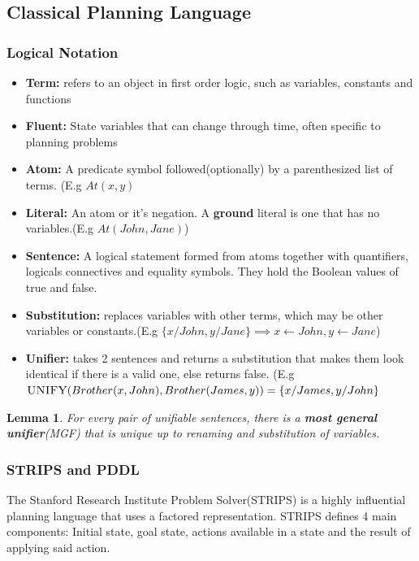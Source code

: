 \documentclass[11pt]{article}
\newtheorem{lemma}{Lemma}
\begin{document}
\subsection{Classical Planning Language}
\subsubsection{Logical Notation} 

\begin{itemize}
    \item \textbf{Term:} refers to an object in first order logic, such as variables, constants and functions
    \item \textbf{Fluent:} State variables that can change through time, often specific to planning problems
    \item \textbf{Atom:} A predicate symbol followed(optionally) by a parenthesized list of terms. (E.g $At(x, y)$
    \item \textbf{Literal:} An atom or it's negation. A \textbf{ground} literal is one that has no variables.(E.g $At(John, Jane)$)
    \item \textbf{Sentence:} A logical statement formed from atoms together with quantifiers, logicals connectives and equality symbols. They hold the Boolean values of true and false.
    \item \textbf{Substitution:} replaces variables with other terms, which may be other variables or constants.(E.g $\{x/John, y/Jane\}\implies x \leftarrow John, y \leftarrow Jane$)
    \item \textbf{Unifier:} takes 2 sentences and returns a substitution that makes them look identical if there is a valid one, else returns false. (E.g $\textsc{UNIFY}(Brother(x, John), Brother(James, y)) =  \{x/James, y/John \}$
\end{itemize}

\begin{lemma}
For every pair of unifiable sentences, there is a \textbf{most general unifier}(MGF) that is unique up to renaming and substitution of variables.
\end{lemma}

\subsubsection{\textsc{STRIPS} and \textsc{PDDL}}

The Stanford Research Institute Problem Solver(\textsc{STRIPS}) is a highly influential planning language that uses a factored representation. \textsc{STRIPS} defines 4 main components: Initial state, goal state, actions available in a state and the result of applying said action.\\
\end{document}

